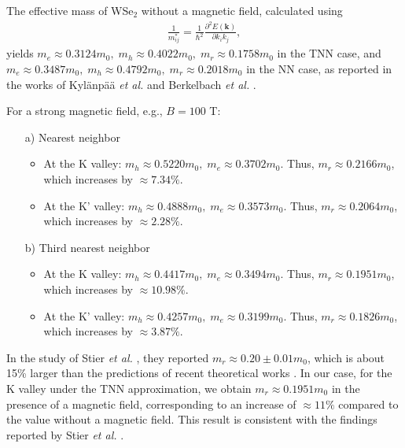 \documentclass{article}
\begin{document}
The effective mass of WSe$_{2}$ without a magnetic field, calculated using
\begin{gather}
	\frac{1}{m_{ij}^{*}} = \frac{1}{\hbar^{2}} \frac{\partial^{2} E(\mathbf{k})}{\partial k_{i} k_{j}},
\end{gather}
yields $m_{e} \approx 0.3124 m_{0},\; m_{h} \approx 0.4022 m_{0},\; m_{r} \approx 0.1758 m_{0}$ in the TNN case, and $m_{e} \approx 0.3487 m_{0},\; m_{h} \approx 0.4792 m_{0},\; m_{r} \approx 0.2018 m_{0}$ in the NN case, as reported in the works of Kyl\"{a}np\"{a}\"{a} \textit{et al.} and Berkelbach \textit{et al.} \cite{berkelbach2013,kylanpaa2015}.

For a strong magnetic field, e.g., $B = 100$ T:
\begin{itemize}
	\item[a)] Nearest neighbor
	      \begin{itemize}
		      \item At the K valley: $m_{h} \approx 0.5220 m_{0},\; m_{e} \approx 0.3702 m_{0}$. Thus, $m_{r} \approx 0.2166 m_{0}$, which increases by $\approx 7.34\%$.
		      \item At the K' valley: $m_{h} \approx 0.4888 m_{0},\; m_{e} \approx 0.3573 m_{0}$. Thus, $m_{r} \approx 0.2064 m_{0}$, which increases by $\approx 2.28\%$.
	      \end{itemize}
	\item[b)] Third nearest neighbor
	      \begin{itemize}
		      \item At the K valley: $m_{h} \approx 0.4417 m_{0},\; m_{e} \approx 0.3494 m_{0}$. Thus, $m_{r} \approx 0.1951 m_{0}$, which increases by $\approx 10.98\%$.
		      \item At the K' valley: $m_{h} \approx 0.4257 m_{0},\; m_{e} \approx 0.3199 m_{0}$. Thus, $m_{r} \approx 0.1826 m_{0}$, which increases by $\approx 3.87\%$.
	      \end{itemize}
\end{itemize}

In the study of Stier \textit{et al.} \cite{stier2018}, they reported $m_{r} \approx 0.20 \pm 0.01 m_{0}$, which is about 15\% larger than the predictions of recent theoretical works \cite{berkelbach2013,kylanpaa2015}. In our case, for the K valley under the TNN approximation, we obtain $m_{r} \approx 0.1951 m_{0}$ in the presence of a magnetic field, corresponding to an increase of $\approx 11\%$ compared to the value without a magnetic field. This result is consistent with the findings reported by Stier \textit{et al.} \cite{stier2018}.
\end{document}
